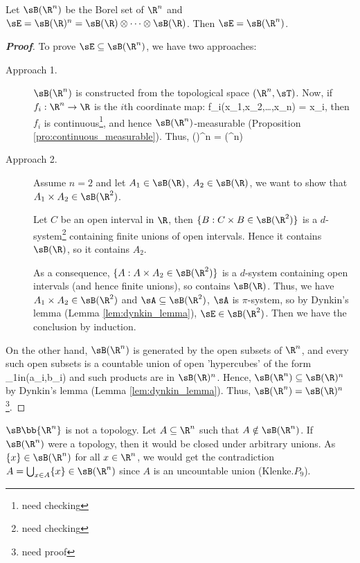 \begin{proposition}
Let $\sB(\R^n)$ be the Borel set of $\R^n$ and $\sE = \sB(\R)^n = \sB(\R)\otimes \dots\otimes \sB(\R)$. Then $\sE = \sB(\R^n)$.
\end{proposition}
\begin{proof}[\bf Proof]
To prove $\sE\subseteq \sB(\R^n)$, we have two approaches:
\begin{description}
\item [Approach 1.] $\sB(\R^n)$ is constructed from the topological space $(\R^n,\sT)$. Now, if $f_i:\R^n\to \R$ is the $i$th coordinate map:
\be
f_i(x_1,x_2,\dots,x_n) = x_i,
\ee
then $f_i$ is continuous\footnote{need checking}, and hence $\sB(\R^n)$-measurable (Proposition \ref{pro:continuous_measurable}). Thus,
\be
\sB(\R)^n = \sigma{} \subseteq \sB(\R^n)
\ee
\item [Approach 2.] Assume $n=2$ and let $A_1\in \sB(\R)$, $A_2 \in \sB(\R)$, we want to show that $A_1\times A_2 \in \sB(\R^2)$.

Let $C$ be an open interval in $\R$, then $\{B :C\times B \in \sB(\R^2)\}$ is a $d$-system\footnote{need checking} containing finite unions of open intervals. Hence it contains $\sB(\R)$, so it contains $A_2$.

As a consequence, $\{A :A\times A_2\in \sB(\R^2)\}$ is a $d$-system containing open intervals (and hence finite unions), so contains $\sB(\R)$. Thus, we have $A_1\times A_2 \in \sB(\R^2)$ and $\sA \subseteq \sB(\R^2)$, $\sA$ is $\pi$-system, so by Dynkin's lemma (Lemma \ref{lem:dynkin_lemma}), $\sE \in \sB(\R^2)$. Then we have the conclusion by induction.
\end{description}

On the other hand, $\sB(\R^n)$ is generated by the open subsets of $\R^n$, and every such open subsets is a countable union of open 'hypercubes' of the form
\be
\prod_{1\leq i\leq n}(a_i,b_i)
\ee
and such products are in $\sB(\R)^n$. Hence, $\sB(\R^n) \subseteq \sB(\R)^n$ by Dynkin's lemma (Lemma \ref{lem:dynkin_lemma}). Thus, $\sB(\R^n) = \sB(\R)^n$\footnote{need proof}.
\end{proof}

\begin{remark}
$\sB\bb{\R^n}$ is not a topology. Let $A\subseteq \R^n$ such that $A \notin \sB(\R^n)$. If $\sB(\R^n)$ were a topology, then it would be closed under arbitrary unions. As $\{x\}\in \sB(\R^n)$ for all $x\in \R^n$, we would get the contradiction $A = \bigcup_{x\in A}\{x\}\in \sB(\R^n)$ since $A$ is an uncountable union (Klenke\cite{Klenke_2008}.$P_9$).
\end{remark}

